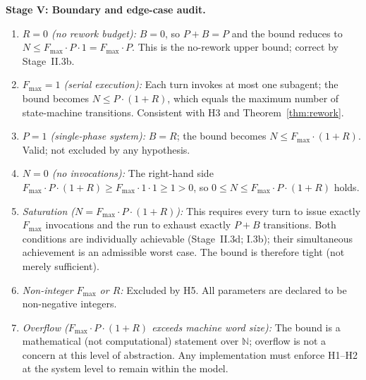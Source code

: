 \documentclass[12pt]{article}
\theoremstyle{definition}
\begin{document}
\medskip
\noindent\textbf{Stage V: Boundary and edge-case audit.}
\begin{enumerate}
    \item[V.1] \emph{$R = 0$ (no rework budget):}
               $B = 0$, so $P + B = P$ and the bound reduces to
               $N \leq F_{\max} \cdot P \cdot 1 = F_{\max} \cdot P$.
               This is the no-rework upper bound; correct by
               Stage~II.3b.
    \item[V.2] \emph{$F_{\max} = 1$ (serial execution):}
               Each turn invokes at most one subagent; the bound
               becomes $N \leq P \cdot (1+R)$, which equals the
               maximum number of state-machine transitions.  Consistent
               with H3 and Theorem~\ref{thm:rework}.
    \item[V.3] \emph{$P = 1$ (single-phase system):}
               $B = R$; the bound becomes $N \leq F_{\max} \cdot (1+R)$.
               Valid; not excluded by any hypothesis.
    \item[V.4] \emph{$N = 0$ (no invocations):}
               The right-hand side $F_{\max} \cdot P \cdot (1+R)
               \geq F_{\max} \cdot 1 \cdot 1 \geq 1 > 0$, so
               $0 \leq N \leq F_{\max} \cdot P \cdot (1+R)$ holds.
    \item[V.5] \emph{Saturation ($N = F_{\max} \cdot P \cdot (1+R)$):}
               This requires every turn to issue exactly $F_{\max}$
               invocations and the run to exhaust exactly $P + B$
               transitions.  Both conditions are individually achievable
               (Stage~II.3d; I.3b); their simultaneous achievement is
               an admissible worst case.  The bound is therefore tight
               (not merely sufficient).
    \item[V.6] \emph{Non-integer $F_{\max}$ or $R$:}
               Excluded by H5.  All parameters are declared to be
               non-negative integers.
    \item[V.7] \emph{Overflow ($F_{\max} \cdot P \cdot (1+R)$
               exceeds machine word size):}
               The bound is a mathematical (not computational) statement
               over $\mathbb{N}$; overflow is not a concern at this level
               of abstraction.  Any implementation must enforce H1--H2
               at the system level to remain within the model.
\end{enumerate}
\end{document}
